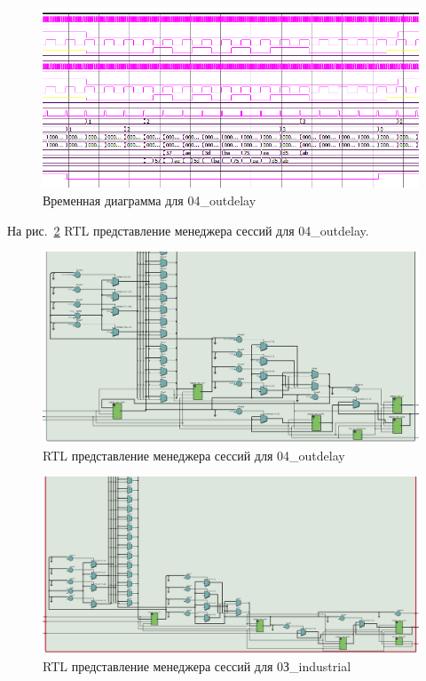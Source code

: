 \documentclass[a4paper,14pt]{article}
\begin{document}
	\begin{figure}[H]
		\centering
		\includegraphics[width=0.9\linewidth]{images/z5_msim_wvf}
		\caption{Временная диаграмма для 04\_outdelay}
		\label{fig:z5msimwvf}
	\end{figure}
	
	На рис.~\ref{fig:z5rtl} RTL представление менеджера сессий для 04\_outdelay.
	
	\begin{figure}[H]
		\centering
		\includegraphics[width=0.9\linewidth]{images/z5_rtl}
		\caption{RTL представление менеджера сессий для 04\_outdelay}
		\label{fig:z5rtl}
	\end{figure}

	\begin{figure}[H]
		\centering
		\includegraphics[width=0.9\linewidth]{images/9_5}
		\caption{RTL представление менеджера сессий для 0З\_industrial}
		\label{fig:95}
	\end{figure}
	
\end{document}
